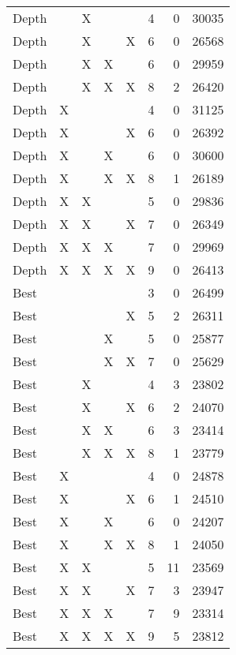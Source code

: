 \begin{tabular}{lllllrrr}
   Depth &    &  X &    &    &        4 &       0 &      30035 \\
   Depth &    &  X &    &  X &        6 &       0 &      26568 \\
   Depth &    &  X &  X &    &        6 &       0 &      29959 \\
   Depth &    &  X &  X &  X &        8 &       2 &      26420 \\
   Depth &  X &    &    &    &        4 &       0 &      31125 \\
   Depth &  X &    &    &  X &        6 &       0 &      26392 \\
   Depth &  X &    &  X &    &        6 &       0 &      30600 \\
   Depth &  X &    &  X &  X &        8 &       1 &      26189 \\
   Depth &  X &  X &    &    &        5 &       0 &      29836 \\
   Depth &  X &  X &    &  X &        7 &       0 &      26349 \\
   Depth &  X &  X &  X &    &        7 &       0 &      29969 \\
   Depth &  X &  X &  X &  X &        9 &       0 &      26413 \\
    Best &    &    &    &    &        3 &       0 &      26499 \\
    Best &    &    &    &  X &        5 &       2 &      26311 \\
    Best &    &    &  X &    &        5 &       0 &      25877 \\
    Best &    &    &  X &  X &        7 &       0 &      25629 \\
    Best &    &  X &    &    &        4 &       3 &      23802 \\
    Best &    &  X &    &  X &        6 &       2 &      24070 \\
    Best &    &  X &  X &    &        6 &       3 &      23414 \\
    Best &    &  X &  X &  X &        8 &       1 &      23779 \\
    Best &  X &    &    &    &        4 &       0 &      24878 \\
    Best &  X &    &    &  X &        6 &       1 &      24510 \\
    Best &  X &    &  X &    &        6 &       0 &      24207 \\
    Best &  X &    &  X &  X &        8 &       1 &      24050 \\
    Best &  X &  X &    &    &        5 &      11 &      23569 \\
    Best &  X &  X &    &  X &        7 &       3 &      23947 \\
    Best &  X &  X &  X &    &        7 &       9 &      23314 \\
    Best &  X &  X &  X &  X &        9 &       5 &      23812 \\
\bottomrule
\end{tabular}
\unskip